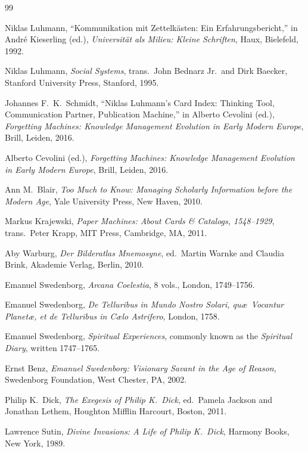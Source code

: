 \documentclass[11pt]{article}
\begin{document}
\clearpage
\begin{thebibliography}{99}

Niklas Luhmann,
``Kommunikation mit Zettelk\"asten: Ein Erfahrungsbericht,''
in Andr\'e Kieserling (ed.),
\emph{Universit\"at als Milieu: Kleine Schriften},
Haux, Bielefeld, 1992.

Niklas Luhmann,
\emph{Social Systems},
trans.\ John Bednarz Jr.\ and Dirk Baecker,
Stanford University Press, Stanford, 1995.

Johannes F.\ K.\ Schmidt,
``Niklas Luhmann's Card Index: Thinking Tool, Communication Partner, Publication Machine,''
in Alberto Cevolini (ed.),
\emph{Forgetting Machines: Knowledge Management Evolution in Early Modern Europe},
Brill, Leiden, 2016.

Alberto Cevolini (ed.),
\emph{Forgetting Machines: Knowledge Management Evolution in Early Modern Europe},
Brill, Leiden, 2016.

Ann M.\ Blair,
\emph{Too Much to Know: Managing Scholarly Information before the Modern Age},
Yale University Press, New Haven, 2010.

Markus Krajewski,
\emph{Paper Machines: About Cards \& Catalogs, 1548--1929},
trans.\ Peter Krapp,
MIT Press, Cambridge, MA, 2011.

Aby Warburg,
\emph{Der Bilderatlas Mnemosyne},
ed.\ Martin Warnke and Claudia Brink,
Akademie Verlag, Berlin, 2010.

Emanuel Swedenborg,
\emph{Arcana Coelestia},
8 vols.,
London, 1749--1756.

Emanuel Swedenborg,
\emph{De Telluribus in Mundo Nostro Solari, qu\ae\ Vocantur Planet\ae, et de Telluribus in C\ae lo Astrifero},
London, 1758.

Emanuel Swedenborg,
\emph{Spiritual Experiences},
commonly known as the \emph{Spiritual Diary},
written 1747--1765.

Ernst Benz,
\emph{Emanuel Swedenborg: Visionary Savant in the Age of Reason},
Swedenborg Foundation, West Chester, PA, 2002.

Philip K.\ Dick,
\emph{The Exegesis of Philip K.\ Dick},
ed.\ Pamela Jackson and Jonathan Lethem,
Houghton Mifflin Harcourt, Boston, 2011.

Lawrence Sutin,
\emph{Divine Invasions: A Life of Philip K.\ Dick},
Harmony Books, New York, 1989.


\end{thebibliography}
\end{document}
